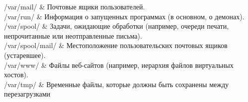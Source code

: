 \begin{center}
/var/mail/ \&	Почтовые ящики пользователей. \\
/var/run/ \&	Информация о запущенных программах (в основном, о демонах). \\
/var/spool/ \&	Задачи, ожидающие обработки (например, очереди печати, непрочитанные или неотправленные письма). \\
/var/spool/mail/ \&	Местоположение пользовательских почтовых ящиков (устаревшее). \\
/var/www/ \&	Файлы веб-сайтов (например, иерархия файлов виртуальных хостов). \\
/var/tmp/ \&	Временные файлы, которые должны быть сохранены между перезагрузками \\
\end{center}

